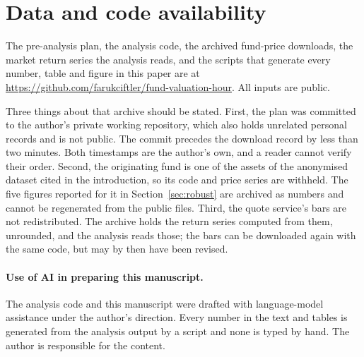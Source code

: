 \documentclass[11pt,a4paper]{article}
\begin{document}
\section{Data and code availability}

The pre-analysis plan, the analysis code, the archived fund-price downloads,
the market return series the analysis reads, and the scripts that generate
every number, table and figure in this paper are at
\url{https://github.com/farukciftler/fund-valuation-hour}. All inputs are
public.

Three things about that archive should be stated. First, the plan was committed
to the author's private working repository, which also holds unrelated personal
records and is not public. The commit precedes the download record by less
than two minutes. Both timestamps are the author's own, and a reader cannot
verify their order. Second, the originating fund is one of the assets of the
anonymised dataset cited in the introduction, so its code and price series are
withheld. The five figures reported for it in Section~\ref{sec:robust} are
archived as numbers and cannot be regenerated from the public files. Third,
the quote service's bars are not redistributed. The archive holds the return
series computed from them, unrounded, and the analysis reads those; the bars
can be downloaded again with the same code, but may by then have been revised.

\paragraph{Use of AI in preparing this manuscript.} The analysis code and this
manuscript were drafted with language-model assistance under the author's
direction. Every number in the text and tables is generated from the analysis
output by a script and none is typed by hand. The author is responsible for
the content.



\end{document}
